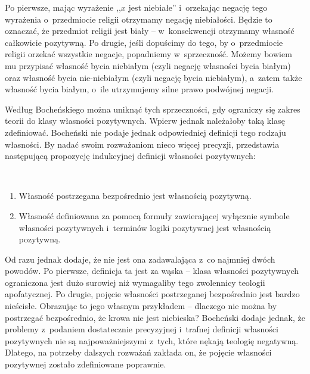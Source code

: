 Po pierwsze, mając wyrażenie ,,$x$ jest niebiałe'' i~orzekając negację tego wyrażenia o~przedmiocie religii otrzymamy negację niebiałości. Będzie to oznaczać, że przedmiot religii jest biały -- w~konsekwencji otrzymamy własność całkowicie pozytywną. Po drugie, jeśli dopuścimy do tego, by o~przedmiocie religii orzekać wszystkie negacje, popadniemy w~sprzeczność. Możemy bowiem mu przypisać własność bycia niebiałym (czyli negację własności bycia białym) oraz własność bycia nie-niebiałym (czyli negację bycia niebiałym), a~zatem także własność bycia białym, o~ile utrzymujemy silne prawo podwójnej negacji.

Według Bocheńskiego można uniknąć tych sprzeczności, gdy ograniczy się zakres teorii do klasy własności pozytywnych. Wpierw jednak należałoby taką klasę zdefiniować. Bocheński nie podaje jednak odpowiedniej definicji tego rodzaju własności. By nadać swoim rozważaniom nieco więcej precyzji, przedstawia następującą propozycję indukcyjnej definicji własności pozytywnych:
\begin{defin}\label{sil-boch-pozytywna}\hfill\ 
\begin{enumerate}%
\item Własność postrzegana bezpośrednio jest własnością pozytywną.
\item Własność definiowana za pomocą formuły zawierającej wyłącznie symbole własności pozytywnych i~terminów logiki pozytywnej jest własnością pozytywną.
\end{enumerate}
\end{defin}
Od razu jednak dodaje, że nie jest ona zadawalająca z~co najmniej dwóch powodów. Po pierwsze, definicja ta jest za wąska -- klasa własności pozytywnych ograniczona jest dużo surowiej niż wymagaliby tego zwolennicy teologii apofatycznej. Po drugie, pojęcie własności postrzeganej bezpośrednio jest bardzo nieścisłe. Obrazując to jego własnym przykładem -- dlaczego nie można by postrzegać bezpośrednio, że krowa nie jest niebieska? Bocheński dodaje jednak, że problemy z~podaniem dostatecznie precyzyjnej i~trafnej definicji własności pozytywnych nie są najpoważniejszymi z~tych, które nękają teologię negatywną. Dlatego, na potrzeby dalszych rozważań zakłada on, że pojęcie własności pozytywnej zostało zdefiniowane poprawnie.

